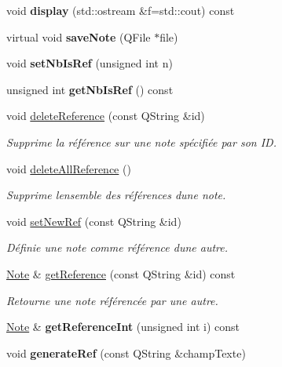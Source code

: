 \begin{DoxyCompactItemize}
void {\bfseries display} (std\+::ostream \&f=std\+::cout) const
\item 
\mbox{\label{class_note_a0c2cc72d7f3235c665a30ef915c5c58d}} 
virtual void {\bfseries save\+Note} (Q\+File $\ast$file)
\item 
\mbox{\label{class_note_acf0ffc4f88903851dce3abf75c3d53f2}} 
void {\bfseries set\+Nb\+Is\+Ref} (unsigned int n)
\item 
\mbox{\label{class_note_a1cb41601ca2dc7c020053c4c0b58f12e}} 
unsigned int {\bfseries get\+Nb\+Is\+Ref} () const
\item 
void \hyperlink{class_note_a91c86cf6ed18e4badb59a41e737a15fa}{delete\+Reference} (const Q\+String \&id)
\begin{DoxyCompactList}\small\item\em Supprime la référence sur une note spécifiée par son ID. \end{DoxyCompactList}\item 
void \hyperlink{class_note_aacbb89b120107a4b25dd16043908c693}{delete\+All\+Reference} ()
\begin{DoxyCompactList}\small\item\em Supprime l\textquotesingle{}ensemble des références d\textquotesingle{}une note. \end{DoxyCompactList}\item 
void \hyperlink{class_note_a3af2edc369310b9f122bd1fd6dbfa717}{set\+New\+Ref} (const Q\+String \&id)
\begin{DoxyCompactList}\small\item\em Définie une note comme référence d\textquotesingle{}une autre. \end{DoxyCompactList}\item 
\hyperlink{class_note}{Note} \& \hyperlink{class_note_a8e3ba6961f62a38f49b5fd209c083896}{get\+Reference} (const Q\+String \&id) const
\begin{DoxyCompactList}\small\item\em Retourne une note référencée par une autre. \end{DoxyCompactList}\item 
\mbox{\label{class_note_a59c51184b95c19d5003287b54c9f5d7f}} 
\hyperlink{class_note}{Note} \& {\bfseries get\+Reference\+Int} (unsigned int i) const
\item 
\mbox{\label{class_note_a5a0cb370ddd5a3da10fe8aa8a256d661}} 
void {\bfseries generate\+Ref} (const Q\+String \&champ\+Texte)
\end{DoxyCompactItemize}
